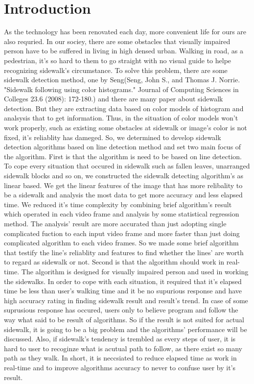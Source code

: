 \documentclass[a4class]{article}
\begin{document}
\section{Introduction}
As the technology has been renovated each day, more convenient life for ours are also requried. In our sociey, there are some obstacles that visually impaired person have to be suffered in living in high densed urban. Walking in road, as a pedestrian, it's so hard to them to go straight with no visual guide to helpe recognizing sidewalk's circumstance. To solve this problem, there are some sidewalk detection method, one by Seng(Seng, John S., and Thomas J. Norrie. "Sidewalk following using color histograms." Journal of Computing Sciences in Colleges 23.6 (2008): 172-180.) and there are many paper about sidewalk detection. But they are extracting data based on color models of histogram and analsysis that to get information. Thus, in the situation of color models won't work properly, such as existing some obstacles at sidewalk or image's color is not fixed, it's reliablity has dameged. So, we determined to develop sidewalk detection algorithms based on line detection method and set two main focus of the algorithm. 
\newline First is that the algorithm is need to be based on line detection. To cope every situation that occured in sidewalk such as fallen leaves, unarranged sidewalk blocks and so on, we constructed the sidewalk detecting algorithm's as linear based. We get the linear features of the image that has more relibality to be a sidewalk and analysis the most data to get more accuracy and less elapsed time. We reduced it's time complexity by combining brief algorithm's result which operated in each video frame and analysis by some statistical regression method. The analysis' result are more accurated than just adopting single complicated fuction to each input video frame and more faster than just doing complicated algorithm to each video frames. So we made some brief algorithm that testify the line's reliablity and features to find whether the lines' are worth to regard as sidewalk or not. 
\newline 
Second is that the algorithm should work in real-time. The algorithm is designed for visually impaired person and used in working the sidewalks. In order to cope with each situation, it required that it's elapsed time be less than user's walking time and it be no supurious response and have high accuracy rating in finding sidewalk result and result's trend. In case of some suprusious response has occured, users only to believe program and follow the way what said to be result of algorithms. So if the result is not suited for actual sidewalk, it is going to be a big problem and the algorithms' performance will be discussed. Also, if sidewalk's tendency is trembled as every steps of user, it is hard to user to recoginze what is acutual path to follow, as there exist so many path as they walk. In short, it is neccsiated to reduce elapsed time as work in real-time and to improve algorithms accuracy to never to confuse user by it's result. 
\end{document}
